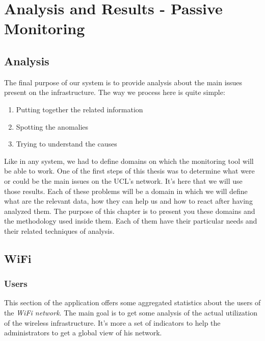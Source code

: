 
\chapter{Analysis and Results - Passive Monitoring} %

\label{Chapter5} %


\section{Analysis}
The final purpose of our system is to provide analysis about the main issues present on the infrastructure. The way we process here is quite simple:

\begin{enumerate}
\item Putting together the related information
\item Spotting the anomalies
\item Trying to understand the causes
\end{enumerate}
Like in any system, we had to define domains on which the monitoring tool will be able to work. One of the first steps of this thesis was to determine what were or could be the main issues on the UCL's network. It's here that we will use those results. Each of these problems will be a domain in which we will define what are the relevant data, how they can help us and how to react after having analyzed them. The purpose of this chapter is to present you these domains and the methodology used inside them. Each of them have their particular needs and their related techniques of analysis.

\section{WiFi}
\subsection{Users}
This section of the application offers some aggregated statistics about the users of the \emph{WiFi network}. The main goal is to get some analysis of the actual utilization of the wireless infrastructure. It's more a set of indicators to help the administrators to get a global view of his network. 

